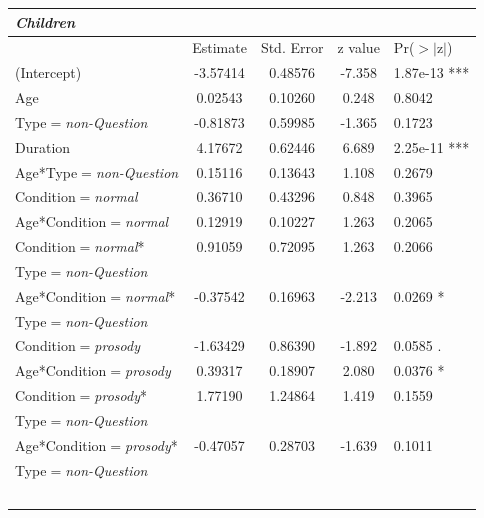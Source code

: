 \documentclass[authoryear, 12pt]{elsarticle}
\begin{document}
\begin{scriptsize}
\begin{longtable}{lcccl}
  \textbf{\textit{Children}} &&&& \\
    \hline
                       & Estimate & Std. Error & z value & Pr($>$$|$z$|$)    \\
    \hline
    (Intercept)                & -3.57414  &   0.48576 &  -7.358 & 1.87e-13 ***    \\
    Age                         & 0.02543 &    0.10260  &  0.248   & 0.8042        \\
    Type$=$\textit{non-Question}                      & -0.81873  &   0.59985 &  -1.365  &  0.1723        \\
    Duration                   &  4.17672  &   0.62446  &  6.689 & 2.25e-11 ***    \\
    Age*Type$=$\textit{non-Question}                &    0.15116   &  0.13643  &  1.108  &  0.2679        \\
	\hline
    Condition$=$\textit{normal}            &  0.36710 &    0.43296 &   0.848  &  0.3965        \\
    Age*Condition$=$\textit{normal}       &   0.12919 &    0.10227  &  1.263  &  0.2065        \\
    Condition$=$\textit{normal}*     &   0.91059  &   0.72095  &  1.263 &   0.2066        \\
    \hspace*{5mm} Type$=$\textit{non-Question} &&&& \\
    Age*Condition$=$\textit{normal}* &   -0.37542  &   0.16963  & -2.213 &   0.0269 *      \\
    \hspace*{5mm} Type$=$\textit{non-Question} &&&& \\
	\hline
    Condition$=$\textit{prosody}         &   -1.63429  &   0.86390 &  -1.892   & 0.0585 .      \\
    Age*Condition$=$\textit{prosody}       &   0.39317 &     0.18907 &   2.080  &  0.0376 *      \\
    Condition$=$\textit{prosody}*     &  1.77190  &   1.24864  &  1.419 &   0.1559        \\
    \hspace*{5mm} Type$=$\textit{non-Question} &&&& \\
    Age*Condition$=$\textit{prosody}* &  -0.47057 &    0.28703 &  -1.639 &   0.1011        \\
    \hspace*{5mm} Type$=$\textit{non-Question} &&&& \\
$$
\end{longtable}
\end{scriptsize}
\end{document}
